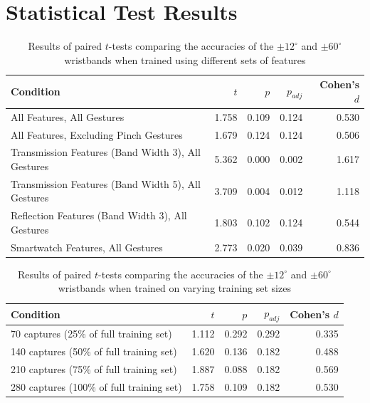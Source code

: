 \documentclass[ oneside,%
                    author={Jack Jarvis},
                    degree={BSc},
                     title={FlexIR: Flexible PCB Wristbands for Infrared Based Gesture Recognition},
                    unit={COMS30045},
                    subtitle={Investigating the Effect of LED Viewing Angle on Gesture Classification in Infrared Sensing Systems}]{dissertation}
\begin{document}
\chapter{Statistical Test Results}
\label{appx:stats_results}

\begin{table}[htp]
    \centering
    \begin{tabular}{lrrrr}
        \toprule
        Condition & $t$ & $p$ & $p_{adj}$ & Cohen's $d$ \\
        \midrule
        All Features, All Gestures & 1.758 & 0.109 & 0.124 & 0.530 \\
        All Features, Excluding Pinch Gestures & 1.679 & 0.124 & 0.124 & 0.506 \\
        Transmission Features (Band Width 3), All Gestures & 5.362 & 0.000 & 0.002 & 1.617 \\
        Transmission Features (Band Width 5), All Gestures & 3.709 & 0.004 & 0.012 & 1.118 \\
        Reflection Features (Band Width 3), All Gestures & 1.803 & 0.102 & 0.124 & 0.544 \\
        Smartwatch Features, All Gestures & 2.773 & 0.020 & 0.039 & 0.836 \\
        \bottomrule
    \end{tabular}
    \caption{Results of paired $t$-tests comparing the accuracies of the $\pm 12^\circ$ and $\pm 60^\circ$ wristbands when trained using different sets of features}
    \label{tab:overall_results}
\end{table}

\begin{table}[htp]
    \centering
    \begin{tabular}{lrrrr}
        \toprule
        Condition & $t$ & $p$ & $p_{adj}$ & Cohen's $d$ \\
        \midrule
        70 captures (25\% of full training set) & 1.112 & 0.292 & 0.292 & 0.335 \\
        140 captures (50\% of full training set) & 1.620 & 0.136 & 0.182 & 0.488 \\
        210 captures (75\% of full training set) & 1.887 & 0.088 & 0.182 & 0.569 \\
        280 captures (100\% of full training set) & 1.758 & 0.109 & 0.182 & 0.530 \\
        \bottomrule
    \end{tabular}
    \caption{Results of paired $t$-tests comparing the accuracies of the $\pm 12^\circ$ and $\pm 60^\circ$ wristbands when trained on varying training set sizes}
    \label{tab:training_set_results}
\end{table}
\end{document}
